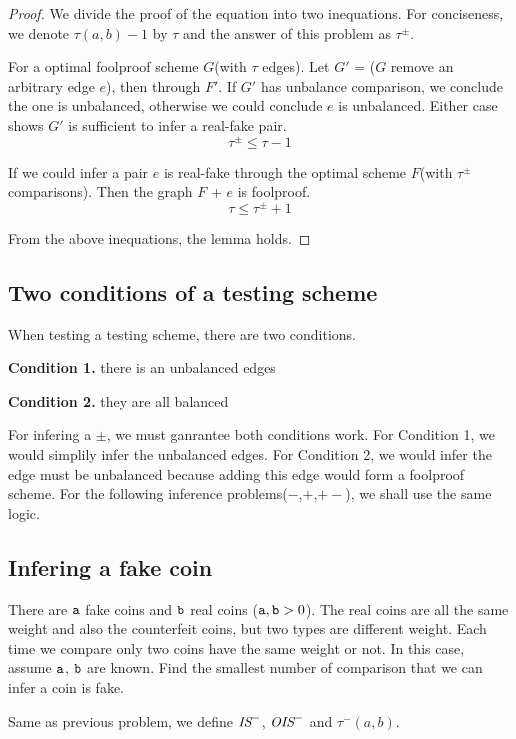 \begin{proof}
We divide the proof of the equation into two inequations. For conciseness, we denote $\tau(a,b)-1$ by $\tau$ and the answer of this problem as $\tau^\pm$.

For a optimal foolproof scheme $G$(with $\tau$ edges). Let $G'$ = ($G$ remove an arbitrary edge $e$), then through $F'$.
If $G'$ has unbalance comparison, we conclude the one is unbalanced, otherwise we could conclude $e$ is unbalanced.
Either case shows $G'$ is sufficient to infer a real-fake pair.
\[\tau^\pm \leq \tau-1\]

If we could infer a pair $e$ is real-fake through the optimal scheme $F$(with $\tau^\pm$ comparisons).
Then the graph $F$ + $e$ is foolproof.
\[\tau\leq \tau^\pm+1\]

From the above inequations, the lemma holds.

\end{proof}
\subsection*{Two conditions of a testing scheme}

When testing a testing scheme, there are two conditions.

\textbf{Condition 1.} there is an unbalanced edges

\textbf{Condition 2.} they are all balanced

For infering a $\pm$, we must ganrantee both conditions work. For Condition 1, we would simplily infer the unbalanced edges. For Condition 2, we would infer the edge must be unbalanced because adding this edge would form a foolproof scheme.
For the following inference problems($-$,$+$,$+-$), we shall use the same logic. 

\subsection*{Infering a fake coin}
{
\setlength{\leftskip}{1cm}
\setlength{\rightskip}{1cm}
\noindent 
There are $\mathtt{a}$ fake coins and $\mathtt{b}$ real coins ($\mathtt{a}, \mathtt{b} > 0$). The real coins are all the same weight and also the counterfeit coins, but two  types are different weight. Each time we compare only two coins have the same weight or not. In this case, assume $\mathtt{a}$, $\mathtt{b}$ are known.
Find the smallest number of comparison that we can infer a coin is fake.\\

}


\begin{definition}
Same as previous problem, we define $\text{\it IS}^-$, $\text{\it OIS}^-$ and $\tau^-(a,b)$.
\end{definition}

